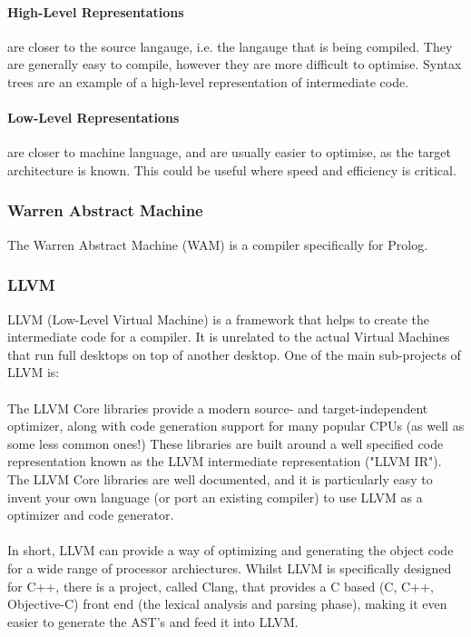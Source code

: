\documentclass[12pt]{report}
\begin{document}
\paragraph{High-Level Representations} are closer to the source langauge, i.e. the langauge that is being compiled.  They are generally easy to compile, however they are more difficult to optimise.  Syntax trees are an example of a high-level representation of intermediate code.
\paragraph{Low-Level Representations} are closer to machine language, and are usually easier to optimise, as the target architecture is known.  This could be useful where speed and efficiency is critical.
\subsubsection{Warren Abstract Machine}\label{subsubsec:wam}
The Warren Abstract Machine (WAM) is a compiler specifically for Prolog.
\subsubsection{LLVM}\label{subsubsec:llvm}
LLVM (Low-Level Virtual Machine) is a framework that helps to create the intermediate code for a compiler.  It is unrelated to the actual Virtual Machines that run full desktops on top of another desktop.  One of the main sub-projects of LLVM is:\\
\\
The LLVM Core libraries provide a modern source- and target-independent optimizer, along with code generation support for many popular CPUs (as well as some less common ones!) These libraries are built around a well specified code representation known as the LLVM intermediate representation ("LLVM IR"). The LLVM Core libraries are well documented, and it is particularly easy to invent your own language (or port an existing compiler) to use LLVM as a optimizer and code generator. \citep{llvm10}
\\
\\
In short, LLVM can provide a way of optimizing and generating the object code for a wide range of processor archiectures.  Whilst LLVM is specifically designed for C++, there is a project, called Clang, that provides a C based (C, C++, Objective-C) front end (the lexical analysis and parsing phase), making it even easier to generate the AST's and feed it into LLVM.
\end{document}
